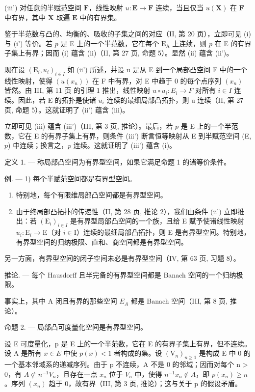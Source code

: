 (iii') 对任意的半赋范空间 \(\mathbf{F}\)，线性映射 \(u: \mathbf{E} \to \mathbf{F}\) 连续，当且仅当 \(u(\mathbf{X})\) 在 \(\mathbf{F}\) 中有界，其中 \(\mathbf{X}\) 取遍 \(\mathbf{E}\) 中的有界集。

鉴于半范数与凸的、均衡的、吸收的子集之间的对应（II, 第 20 页），立即可见 (i) 与 (i') 等价。若 \(p\) 是 E 上的一个半范数，它在每个 \(\mathrm{E}_{\mathrm{A}}\) 上连续，则 \(p\) 在 E 的有界子集上有界；因而 (i) 蕴含 (ii)（II, 第 27 页, 命题 5）。显然 (ii) 蕴含 (ii')。

现在设 \((\mathrm{E}_{i}, u_{i})_{i\in I}\) 如 (ii') 所述，并设 u 是从 E 到一个局部凸空间 F 中的一个线性映射，使得 \((u(x_{n}))\) 在 F 中有界，对 E 中趋于 0 的每个点序列 \((x_{n})\) 皆然。由 III, 第 11 页 的引理 1 推出，线性映射 \(u\circ u_{i}:E_{i}\to F\) 对所有 \(i\in I\) 连续。因此，若 E 的拓扑是使诸 \(u_{i}\) 连续的最细局部凸拓扑，则 u 连续（II, 第 27 页, 命题 5）。这就证明了 (ii') 蕴含 (iii)。

立即可见 (iii) 蕴含 (iii')（III, 第 3 页, 推论）。最后，若 \(p\) 是 E 上的一个半范数，它在 E 的有界子集上有界，则条件 (iii') 断言恒等映射从 E 到半赋范空间 (E, \(p\)) 中连续；换言之，\(p\) 连续。这就证明了 (iii') 蕴含 (i)。

定义 1. --- 称局部凸空间为有界型空间，如果它满足命题 1 的诸等价条件。

例. --- 1) 每个半赋范空间都是有界型空间。

\begin{enumerate}
\def\labelenumi{\arabic{enumi})}
\setcounter{enumi}{1}
\item
  特别地，每个有限维局部凸空间都是有界型空间。
\item
  由于终局部凸拓扑的传递性（II, 第 28 页, 推论 2），我们由条件 (ii') 立即推出：若 \((\mathrm{E}_i)_{i\in I}\) 是有界型局部凸空间的一个族，且给 E 赋予使诸线性映射 \(u_{i}:\mathrm{E}_{i}\to \mathrm{E}\)（对 \(i\in \mathrm{I}\)）连续的最细局部凸拓扑，则 E 是有界型空间。特别地，有界型空间的归纳极限、直和、商空间都是有界型空间。
\end{enumerate}

另一方面，有界型空间的闭子空间未必是有界型空间（IV, 第 63 页, 习题 8）。

推论. --- 每个 Hausdorff 且半完备的有界型空间都是 Banach 空间的一个归纳极限。

事实上，其中 A 闭且有界的那些空间 \(E_{A}\) 都是 Banach 空间（III, 第 8 页, 推论）。

命题 2. --- 局部凸可度量化空间是有界型空间。

设 E 可度量化，p 是 E 上的一个半范数，它在 E 的有界子集上有界，但不连续。设 A 是所有 \(x \in E\) 中使 \(p(x) < 1\) 者构成的集。设 \((\mathrm{V}_{n})_{n \geqslant 1}\) 是构成 E 中 0 的一个基本邻域系的递减序列。由于 p 不连续，A 不是 0 的邻域；因而对每个 n \textgreater{} 0，有 \(A \not\subset n^{-1}V_{n}\)，且存在一点 \(x_{n}\) 位于 \(V_{n}\) 中，使得 \(n^{-1}x_{n} \notin A\)，即 \(p(x_{n}) \geqslant n\)。序列 \((x_{n})\) 趋于 0，故有界（III, 第 3 页, 推论）；这与关于 p 的假设矛盾。

